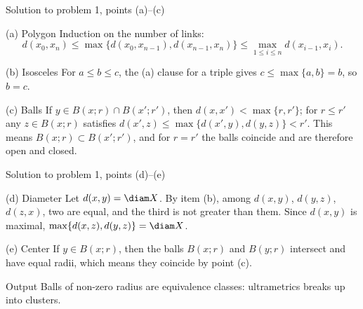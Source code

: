 \documentclass[aspectratio=169,11pt]{beamer}
\begin{document}
\begin{frame}{Solution to problem \textup{1}, points \textup{(a)}--\textup{(c)}}
\begin{block}{\textup{(a)} Polygon}
Induction on the number of links\textup{:}
\[
d(x_0,x_n) \le \max\bigl\{d(x_0,x_{n-1}), d(x_{n-1},x_n)\bigr\} \le \max_{1\le i\le n} d(x_{i-1},x_i).
\]
\end{block}
\begin{block}{\textup{(b)} Isosceles}
For $a \le b \le c$, the \textup{(a)} clause for a triple gives $c \le \max\{a,b\} = b$, so $b = c$.
\end{block}
\begin{block}{\textup{(c)} Balls}
If $y \in B(x;r) \cap B(x';r')$, then $d(x,x') < \max\{r,r'\}$\textup{;} for $r \le r'$ any $z \in B(x;r)$ satisfies $d(x',z) \le \max\{d(x',y), d(y,z)\} < r'$. This means $B(x;r) \subset B(x';r')$, and for $r = r'$ the balls coincide and are therefore open and closed.
\end{block}
\end{frame}

\begin{frame}{Solution to problem \textup{1}, points \textup{(d)}--\textup{(e)}}
\begin{block}{\textup{(d)} Diameter}
Let $d(x,y) = \diam X$. By item \textup{(b)}, among $d(x,y)$, $d(y,z)$, $d(z,x)$, two are equal, and the third is not greater than them. Since $d(x,y)$ is maximal, $\max\{d(x,z), d(y,z)\} = \diam X$.
\end{block}
\begin{block}{\textup{(e)} Center}
If $y \in B(x;r)$, then the balls $B(x;r)$ and $B(y;r)$ intersect and have equal radii, which means they coincide by point \textup{(c)}.
\end{block}
\begin{block}{Output}
Balls of non-zero radius are equivalence classes\textup{:} ultrametrics breaks up into clusters.
\end{block}
\end{frame}
\end{document}
